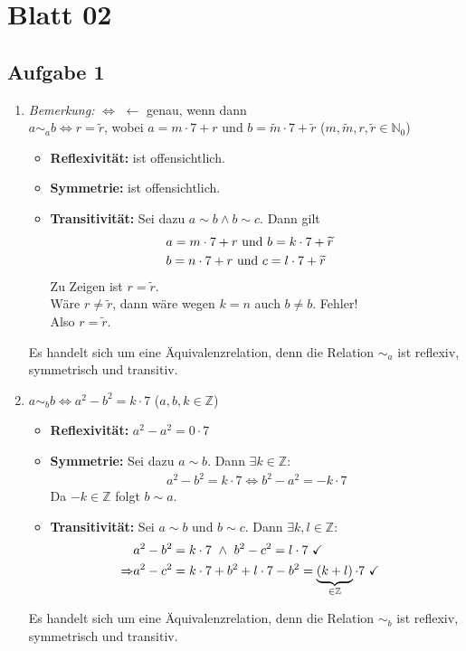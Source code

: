 \chapter{Blatt 02}
\section{Aufgabe 1}
\begin{enumerate}[label={\alph*)}]
  \item \textit{Bemerkung:} $\Leftrightarrow$ $\longleftarrow$ genau, wenn dann \\
  $a\sim_{a}b \Leftrightarrow r=\widetilde{r}$, wobei $a=m\cdot 7+r$ und $b=\widetilde{m}\cdot 7+\widetilde{r}$ ($m, \widetilde{m}, r, \widetilde{r}\in\mathbb{N}_{0}$)
  \begin{itemize}[label=\textbullet]
    \item \textbf{Reflexivität:} ist offensichtlich.
    \item \textbf{Symmetrie:}  ist offensichtlich.
    \item \textbf{Transitivität:} Sei dazu $a\sim b \wedge b\sim c$. Dann gilt
    \begin{align*}
       &a=m\cdot 7+r \textnormal{ und } b=k\cdot 7+\widetilde{r}&\\
       &b=n\cdot 7+r \textnormal{ und } c=l\cdot 7+\widetilde{r}
    \end{align*}
    Zu Zeigen ist $r=\widetilde{r}$.\\
    Wäre $r\neq \widetilde{r}$, dann wäre wegen $k=n$ auch $b\neq b$. Fehler!\\
    Also $r=\widetilde{r}$.
  \end{itemize}
  Es handelt sich um eine Äquivalenzrelation, denn die Relation $\sim_{a}$ ist reflexiv, symmetrisch und transitiv.
  \item
  $a\sim_{b}b \Leftrightarrow a^2-b^2=k\cdot 7$ ($a, b, k \in\mathbb{Z}$)
  \begin{itemize}[label=\textbullet]
    \item \textbf{Reflexivität:} $a^2-a^2=0\cdot 7$ \checkmark
    \item \textbf{Symmetrie:} Sei dazu $a\sim b$. Dann $\exists k\in \mathbb{Z}$:
    \begin{align*}
      &a^2-b^2=k\cdot 7 \Leftrightarrow b^2-a^2=-k\cdot 7&
    \end{align*}
    Da $-k \in \mathbb{Z}$ folgt $b\sim a$.
    \item \textbf{Transitivität:} Sei $a\sim b$ und $b\sim c$. Dann $\exists k,l \in \mathbb{Z}$:
    \begin{align*}
      & a^2-b^2=k\cdot 7 \textnormal{ }\wedge\textnormal{ } b^2-c^2=l\cdot 7 \textnormal{ \checkmark}&\\
      \Rightarrow &a^2-c^2=k\cdot 7 + b^2+l\cdot 7 -b^2=\underbrace{(k+l)}_{\in\mathbb{Z}}\cdot 7 \textnormal{ \checkmark}
    \end{align*}
  \end{itemize}
  Es handelt sich um eine Äquivalenzrelation, denn die Relation $\sim_{b}$ ist reflexiv, symmetrisch und transitiv.
\end{enumerate}
